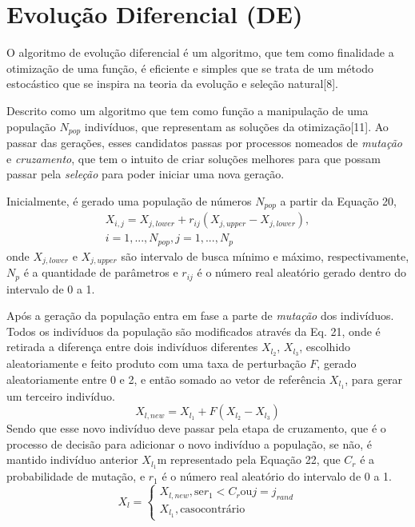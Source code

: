 \documentclass[por]{Template_SBEF}
\begin{document}
\section{Evolução Diferencial (DE)}
O algoritmo de evolução diferencial é um algoritmo, que tem como finalidade a otimização de uma função, é eficiente e simples que se trata de um método estocástico que se inspira na teoria da evolução e seleção natural[8].

Descrito como um algoritmo que tem como função a manipulação de uma população $N_{pop}$ indivíduos, que representam as soluções da otimização[11]. Ao passar das gerações, esses candidatos passas por processos nomeados de \textit{mutação} e \textit{cruzamento}, que tem o intuito de criar soluções melhores para que possam passar pela \textit{seleção} para poder iniciar uma nova geração.

Inicialmente, é gerado uma população de números $N_{pop}$ a partir da Equação 20,
\begin{equation}
\begin{split}
X_{i,j}=X_{j,lower}+r_{ij} (X_{j,upper}-X_{j,lower}),\\
i = 1,...,N_{pop}, j =1, ..., N_p
\end{split}
\end{equation}
onde $X_{j,lower}$ e $X_{j,upper}$ são intervalo de busca mínimo e máximo, respectivamente, $N_p$ é a quantidade de parâmetros e $r_{ij}$ é o número real aleatório gerado dentro do intervalo de 0 a 1.

Após a geração da população entra em fase a parte de \textit{mutação} dos indivíduos. Todos os indivíduos da população são modificados através da Eq. 21, onde é retirada a diferença entre dois indivíduos  diferentes $X_{l_2}$, $X_{l_3}$, escolhido aleatoriamente e feito produto com uma taxa de perturbação $F$, gerado aleatoriamente entre 0 e 2, e então somado ao vetor de referência $X_{l_1}$, para gerar um terceiro indivíduo.
\begin{equation}
X_{l,new}=X_{l_1} + F(X_{l_2} - X_{l_3})
\end{equation}
Sendo que esse novo indivíduo deve passar pela etapa de cruzamento, que é o processo de decisão para adicionar o novo indivíduo a população, se não, é mantido  indivíduo anterior $X_{l_1}$m representado pela Equação 22, que $C_r$ é a probabilidade de mutação, e $r_1$ é o número real aleatório do intervalo de 0 a 1.
\begin{equation}
X_l= \left\{\begin{matrix}
X_{l,new}, \mathrm{se} r_1 < C_r \mathrm{ou} j = j_{rand}\\
 X_{l_1}, \mathrm{caso contrário}

\end{matrix}\right.
\end{equation}
\end{document}
